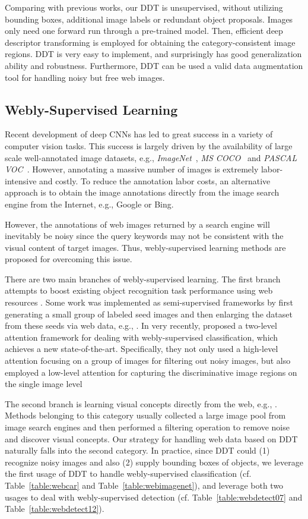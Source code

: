 \documentclass[twocolumn]{svjour3}          \smartqed  \usepackage{graphicx}
\begin{document}
Comparing with previous works, our DDT is unsupervised, without utilizing bounding boxes, additional image labels or redundant object proposals. Images only need one forward run through a pre-trained model. Then, efficient deep descriptor transforming is employed for obtaining the category-consistent image regions. DDT is very easy to implement, and surprisingly has good generalization ability and robustness. Furthermore, DDT can be used a valid data augmentation tool for handling noisy but free web images.

\subsection{Webly-Supervised Learning}

Recent development of deep CNNs has led to great success in a variety of computer vision tasks. This success is largely driven by the availability of large scale well-annotated image datasets, e.g., \emph{ImageNet}~\citep{russaijcv2015}, \emph{MS COCO}~\citep{coco} and \emph{PASCAL VOC}~\citep{voc2015}. However, annotating a massive number of images is extremely labor-intensive and costly. To reduce the annotation labor costs, an alternative approach is to obtain the image annotations directly from the image search engine from the Internet, e.g., Google or Bing.

However, the annotations of web images returned by a search engine will inevitably be noisy since the query keywords may not be consistent with the visual content of target images. Thus, webly-supervised learning methods are proposed for overcoming this issue.

There are two main branches of webly-supervised learning. The first branch attempts to boost existing object recognition task performance using web resources \citep{bohan2017,Georgeiccv2015,rubinscvpr2015}. Some work was implemented as semi-supervised frameworks by first generating a small group of labeled seed images and then enlarging the dataset from these seeds via web data, e.g., \citet{Georgeiccv2015,rubinscvpr2015}. In very recently, \citet{bohan2017} proposed a two-level attention framework for dealing with webly-supervised classification, which achieves a new state-of-the-art. Specifically, they not only used a high-level attention focusing on a group of images for filtering out noisy images, but also employed a low-level attention for capturing the discriminative image regions on the single image level

The second branch is learning visual concepts directly from the web, e.g., \citet{Ferguseccv2004,xinjinpami2016}. Methods belonging to this category usually collected a large image pool from image search engines and then performed a filtering operation to remove noise and discover visual concepts. Our strategy for handling web data based on DDT naturally falls into the second category. In practice, since DDT could (1) recognize noisy images and also (2) supply bounding boxes of objects, we leverage the first usage of DDT to handle webly-supervised classification (cf. Table~\ref{table:webcar} and Table~\ref{table:webimagenet}), and leverage both two usages to deal with webly-supervised detection (cf. Table~\ref{table:webdetect07} and Table~\ref{table:webdetect12}).
\end{document}
